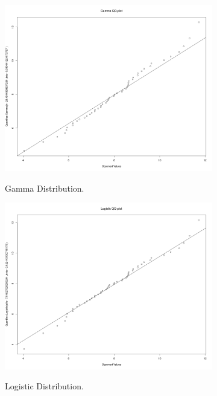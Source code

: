 \documentclass[12pt]{article}
\begin{document}
\begin{figure}[h]
	\begin{subfigure}{.5\linewidth}
		\centering
		\includegraphics[scale=.2]{images/QQPlot_Gamma.png}
		\label{qq_plot_gamma}
		\caption{Gamma Distribution.}
	\end{subfigure}%
	\begin{subfigure}{.5\linewidth}
		\centering
		\includegraphics[scale=.2]{images/QQPlot_Logistic.png}
		\label{qq_plot_logistic}
		\caption{Logistic Distribution.}
	\end{subfigure}\\[1ex]
	\begin{subfigure}{\linewidth}

\end{subfigure}
\end{figure}
\end{document}
